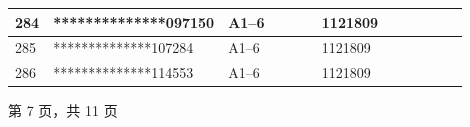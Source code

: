\documentclass[UTF8,10pt,a4paper,fontset=fandol]{ctexart}
\newcommand{\fieldvalue}[1]{#1}
\begin{document}
\begin{center}
\begin{tabular}{|p{0.07\linewidth}|p{0.27\linewidth}|p{0.22\linewidth}|p{0.18\linewidth}|p{0.16\linewidth}|}
284 &
\fieldvalue{**************097150} &
\fieldvalue{A1--6} &
\fieldvalue{1121809} & \\ \hline
285 &
\fieldvalue{**************107284} &
\fieldvalue{A1--6} &
\fieldvalue{1121809} & \\ \hline
286 &
\fieldvalue{**************114553} &
\fieldvalue{A1--6} &
\fieldvalue{1121809} & \\ \hline
\end{tabular}
\end{center}

\begin{center}
第 7 页，共 11 页
\end{center}

\newpage
\end{document}
